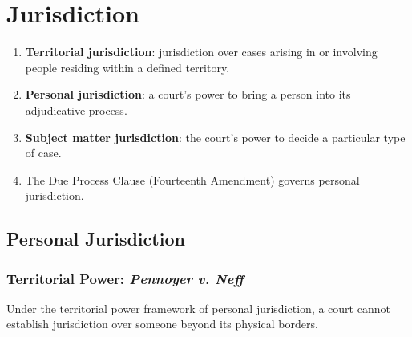 \section{Jurisdiction}

\begin{enumerate}
    \item \textbf{Territorial jurisdiction}: jurisdiction over cases arising in or 
    involving people residing within a defined territory.
    \item \textbf{Personal jurisdiction}: a court's power to bring a person into its 
    adjudicative process.
    \item \textbf{Subject matter jurisdiction}: the court's power to decide a 
    particular type of case.
    \item The Due Process Clause (Fourteenth Amendment) governs personal 
    jurisdiction.
\end{enumerate}

\subsection{Personal Jurisdiction}

\subsubsection{Territorial Power: \emph{Pennoyer v. Neff}}

Under the territorial power framework of personal jurisdiction, a court cannot 
establish jurisdiction over someone beyond its physical borders.

